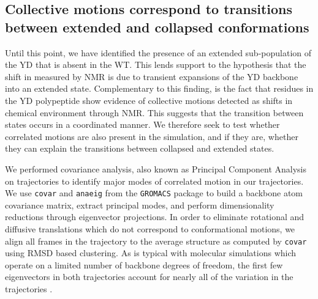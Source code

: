 \begin{figure}
\centering     %
{}

\label{fig:contacts}
\end{figure}


\subsection{Collective motions correspond to transitions between extended and collapsed conformations}

Until this point, we have identified the presence of an extended sub-population of the YD \gct that is absent in the WT. This lends support to the hypothesis that the shift in \diffusion measured by NMR is due to transient expansions of the YD backbone into an extended state. Complementary to this finding, is the fact that residues in the YD polypeptide show evidence of collective motions detected as shifts in chemical environment through NMR. This suggests that the transition between states occurs in a coordinated manner. We therefore seek to test whether correlated motions are also present in the simulation, and if they are, whether they can explain the transitions between collapsed and extended states.

We performed covariance analysis, also known as Principal Component Analysis on \gct trajectories to identify major modes of correlated motion in our trajectories. We use \texttt{covar} and \texttt{anaeig} from the \texttt{GROMACS} package to build a backbone atom covariance matrix, extract principal modes, and perform dimensionality reductions through eigenvector projections. In order to eliminate rotational and diffusive  translations which do not correspond to conformational motions, we align all frames in the trajectory to the average structure as computed by \texttt{covar} using RMSD based clustering. As is typical with molecular simulations which operate on a limited number of backbone degrees of freedom, the first few eigenvectors in both trajectories account for nearly all of the variation in the trajectories . 

